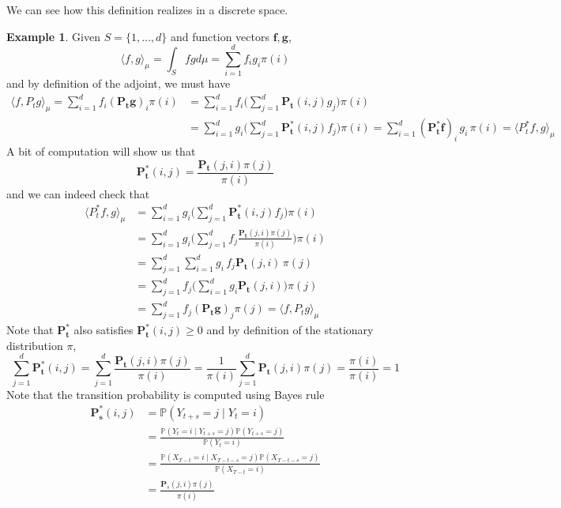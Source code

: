 \documentclass{article}
\theoremstyle{definition}
\newtheorem{example}{Example}[section]
\theoremstyle{remark}
\theoremstyle{definition}
\begin{document}
We can see how this definition realizes in a discrete space. 

\begin{example}
Given $S = \{1, \ldots, d\}$ and function vectors $\mathbf{f}, \mathbf{g}$, 
\[\langle f, g \rangle_\mu = \int_S f g d\mu = \sum_{i=1}^d f_i g_i \pi(i)\]
and by definition of the adjoint, we must have 
\begin{align*}
    \langle f, P_t g \rangle_\mu = \sum_{i=1}^d f_i (\mathbf{P_t} \mathbf{g})_i \pi(i) & = \sum_{i=1}^d f_i \bigg( \sum_{j=1}^d \mathbf{P_t}(i, j) g_j \bigg) \pi(i) \\
    & = \sum_{i=1}^d g_i \bigg( \sum_{j=1}^d \mathbf{P_t^*} (i, j) f_j \bigg) \pi(i) = \sum_{i=1}^d (\mathbf{P_t^*} \mathbf{f})_i \, g_i \, \pi(i) = \langle P_t^* f, g \rangle_\mu 
\end{align*}
A bit of computation will show us that 
\[\mathbf{P_t^*}(i, j) = \frac{\mathbf{P_t}(j, i) \pi(j)}{\pi(i)}\]
and we can indeed check that 
\begin{align*}
    \langle P_t^* f, g \rangle_\mu  & = \sum_{i=1}^d g_i \bigg( \sum_{j=1}^d \mathbf{P_t^*} (i, j) f_j \bigg) \pi(i) \\
    & = \sum_{i=1}^d g_i \bigg( \sum_{j=1}^d f_j \frac{\mathbf{P_t}(j, i) \pi(j)}{\pi(i)} \bigg) \pi(i) \\
    & = \sum_{j=1}^d \sum_{i=1}^d g_i \, f_j \mathbf{P_t}(j, i) \, \pi(j) \\
    & = \sum_{j=1}^d f_j \bigg( \sum_{i=1}^d g_i \mathbf{P_t}(j, i) \bigg) \pi(j) \\
    & = \sum_{j=1}^d f_j (\mathbf{P_t} \mathbf{g})_j \pi(j) = \langle f, P_t g \rangle_\mu
\end{align*}
Note that $\mathbf{P_t^*}$ also satisfies $\mathbf{P_t^*} (i, j) \geq 0$ and by definition of the stationary distribution $\pi$, 
\[\sum_{j=1}^d \mathbf{P_t^*} (i, j) = \sum_{j=1}^d \frac{\mathbf{P_t}(j, i) \pi(j)}{\pi(i)} = \frac{1}{\pi(i)} \sum_{j=1}^d \mathbf{P_t}(j, i) \pi(j) = \frac{\pi(i)}{\pi(i)} = 1 \]
Note that the transition probability is computed using Bayes rule 
\begin{align*}
    \mathbf{P_s^*}(i, j) & = \mathbb{P}(Y_{t + s} = j \mid Y_t = i) \\
    & = \frac{\mathbb{P}(Y_t = i \mid Y_{t + s} = j) \mathbb{P}(Y_{t + s} = j)}{\mathbb{P}(Y_t = i)} \\
    & = \frac{\mathbb{P}(X_{T - t} = i \mid X_{T - t - s} = j) \mathbb{P}(X_{T - t - s} = j)}{\mathbb{P}(X_{T - t} = i)} \\
    & = \frac{\mathbf{P}_s (j, i) \pi(j)}{\pi(i)}
\end{align*}
\end{example}
\end{document}
